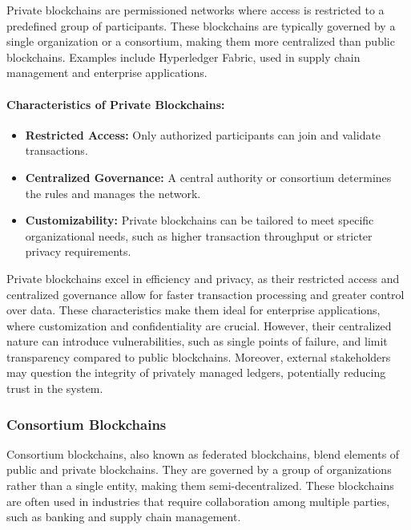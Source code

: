 Private blockchains are permissioned networks where access is restricted to a predefined group of participants. These blockchains are typically governed by a single organization or a consortium, making them more centralized than public blockchains. Examples include Hyperledger Fabric, used in supply chain management and enterprise applications. 


\paragraph{Characteristics of Private Blockchains:}
\begin{itemize}
    \item \textbf{Restricted Access:} Only authorized participants can join and validate transactions.
    \item \textbf{Centralized Governance:} A central authority or consortium determines the rules and manages the network.
    \item \textbf{Customizability:} Private blockchains can be tailored to meet specific organizational needs, such as higher transaction throughput or stricter privacy requirements.
\end{itemize}

Private blockchains excel in efficiency and privacy, as their restricted access and centralized governance allow for faster transaction processing and greater control over data. These characteristics make them ideal for enterprise applications, where customization and confidentiality are crucial. 
However, their centralized nature can introduce vulnerabilities, such as single points of failure, and limit transparency compared to public blockchains. Moreover, external stakeholders may question the integrity of privately managed ledgers, potentially reducing trust in the system. \cite{androulaki_hyperledger_2018}

\subsubsection{Consortium Blockchains}

Consortium blockchains, also known as federated blockchains, blend elements of public and private blockchains. They are governed by a group of organizations rather than a single entity, making them semi-decentralized. These blockchains are often used in industries that require collaboration among multiple parties, such as banking and supply chain management. \cite{cachin_blockchain_2017}

